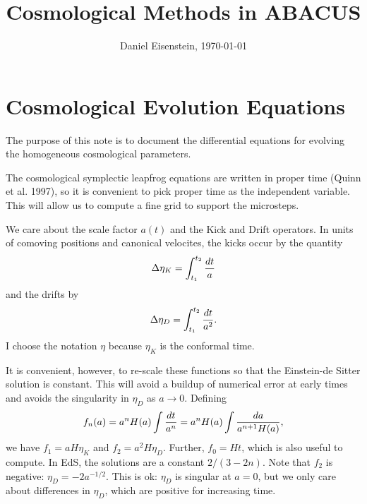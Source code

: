 \documentclass[11pt,preprint]{aastex}
\begin{document}
\title{Cosmological Methods in ABACUS}
\author{Daniel Eisenstein, \today}

\section{Cosmological Evolution Equations}

The purpose of this note is to document the differential equations
for evolving the homogeneous cosmological parameters.

The cosmological symplectic leapfrog equations are written in proper
time (Quinn et al. 1997), so it is convenient to pick proper time as
the independent variable.  This will allow us to compute a fine grid
to support the microsteps.

We care about the scale factor $a(t)$ and the Kick and Drift operators.
In units of comoving positions and canonical velocites, the kicks 
occur by the quantity 
\begin{equation}
\Delta \eta_K = \int_{t_1}^{t_2} {dt\over a}
\end{equation}
and the drifts by
\begin{equation}
\Delta \eta_D = \int_{t_1}^{t_2} {dt\over a^2}.
\end{equation}
I choose the notation $\eta$ because $\eta_K$ is the conformal time.

It is convenient, however, to re-scale these functions so that the
Einstein-de Sitter solution is constant.  This will avoid a buildup
of numerical error at early times and avoids the singularity in
$\eta_D$ as $a\rightarrow0$.  Defining
\begin{equation}
f_n(a) = a^n H(a) \int {dt\over a^n} = a^n H(a) \int {da\over a^{n+1} H(a)},
\end{equation}
we have $f_1 = aH\eta_K$ and $f_2 = a^2 H\eta_D$.  
Further, $f_0 = H t$, which is also useful to compute.  
In EdS, the solutions
are a constant $2/(3-2n)$.  Note that $f_2$ is negative: $\eta_D = -2a^{-1/2}$.
This is ok: $\eta_D$ is singular at $a=0$, but we only care about differences
in $\eta_D$, which are positive for increasing time.
\end{document}
